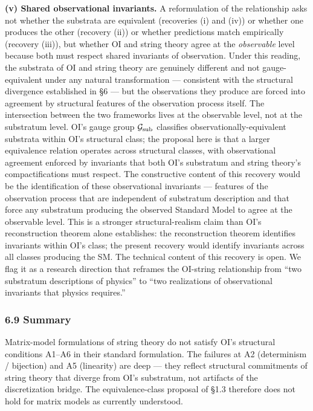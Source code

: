 \documentclass[
]{article}
\begin{document}
\textbf{(v) Shared observational invariants.} A reformulation of the
relationship asks not whether the substrata are equivalent (recoveries
(i) and (iv)) or whether one produces the other (recovery (ii)) or
whether predictions match empirically (recovery (iii)), but whether OI
and string theory agree at the \emph{observable} level because both must
respect shared invariants of observation. Under this reading, the
substrata of OI and string theory are genuinely different and not
gauge-equivalent under any natural transformation --- consistent with
the structural divergence established in §6 --- but the observations
they produce are forced into agreement by structural features of the
observation process itself. The intersection between the two frameworks
lives at the observable level, not at the substratum level. OI's gauge
group \(\mathcal{G}_{\rm sub}\) classifies observationally-equivalent
substrata within OI's structural class; the proposal here is that a
larger equivalence relation operates across structural classes, with
observational agreement enforced by invariants that both OI's substratum
and string theory's compactifications must respect. The constructive
content of this recovery would be the identification of these
observational invariants --- features of the observation process that
are independent of substratum description and that force any substratum
producing the observed Standard Model to agree at the observable level.
This is a stronger structural-realism claim than OI's reconstruction
theorem alone establishes: the reconstruction theorem identifies
invariants within OI's class; the present recovery would identify
invariants across all classes producing the SM. The technical content of
this recovery is open. We flag it as a research direction that reframes
the OI-string relationship from ``two substratum descriptions of
physics'' to ``two realizations of observational invariants that physics
requires.''

\hypertarget{summary}{%
\subsubsection{6.9 Summary}\label{summary}}

Matrix-model formulations of string theory do not satisfy OI's
structural conditions A1--A6 in their standard formulation. The failures
at A2 (determinism / bijection) and A5 (linearity) are deep --- they
reflect structural commitments of string theory that diverge from OI's
substratum, not artifacts of the discretization bridge. The
equivalence-class proposal of §1.3 therefore does not hold for matrix
models as currently understood.
\end{document}
